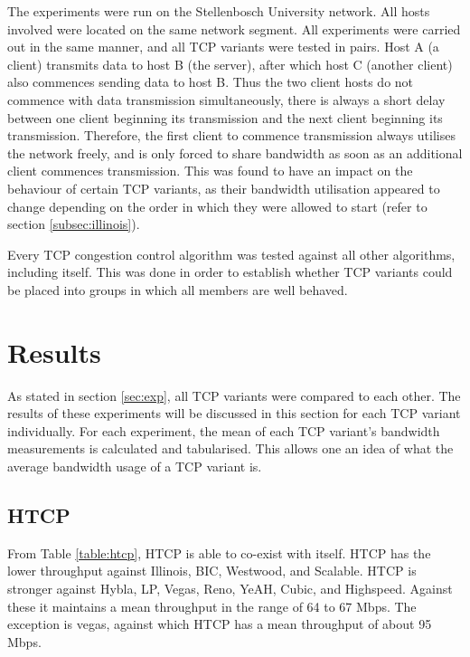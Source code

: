 \documentclass[11pt,a4paper,twocolumn]{article}
\begin{document}
The experiments were run on the Stellenbosch University network. All hosts involved were located on the same network segment. All experiments
were carried out in the same manner, and all TCP variants were tested in pairs. Host A (a client) transmits data to host B (the server), after which host C (another client) also commences
sending data to host B. Thus the two client hosts do not commence with data transmission simultaneously, there is always a short delay between
one client beginning its transmission and the next client beginning its transmission. Therefore, the first client to commence transmission
always utilises the network freely, and is only forced to share bandwidth as soon as an additional client commences transmission.
This was found to have an impact on the behaviour of certain TCP variants, as their bandwidth utilisation appeared to change depending
on the order in which they were allowed to start (refer to section \ref{subsec:illinois}).

Every TCP congestion control algorithm was tested against all other algorithms, including itself. This was done in order to establish whether TCP variants
could be placed into groups in which all members are well behaved.

\section{Results}
\label{sec:results}

As stated in section \ref{sec:exp}, all TCP variants were compared to each other. The results of these experiments will
be discussed in this section for each TCP variant individually. For each experiment, the mean of each TCP variant's bandwidth measurements
is calculated and tabularised. This allows one an idea of what the average bandwidth usage of a TCP variant is.

\subsection{HTCP}
From Table \ref{table:htcp}, HTCP is able to co-exist with itself. HTCP has the lower throughput against Illinois, BIC, Westwood, and Scalable. 
HTCP is stronger against Hybla, LP, Vegas, Reno, YeAH, Cubic, and Highspeed. Against these it maintains a mean throughput
in the range of 64 to 67 Mbps. The exception is vegas, against which HTCP has a mean throughput of about 95 Mbps.
\end{document}
